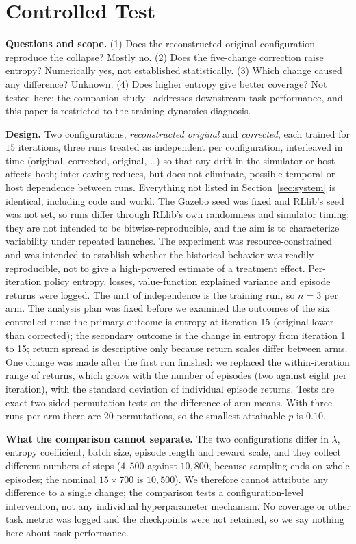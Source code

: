 \documentclass[12pt]{article}
\begin{document}
\section{Controlled Test}
\label{sec:test}
\textbf{Questions and scope.} (1) Does the reconstructed original configuration reproduce the collapse? Mostly no. (2) Does the five-change correction raise entropy? Numerically yes, not established statistically. (3) Which change caused any difference? Unknown. (4) Does higher entropy give better coverage? Not tested here; the companion study~\cite{pandhe2026mappo} addresses downstream task performance, and this paper is restricted to the training-dynamics diagnosis.

\textbf{Design.} Two configurations, \emph{reconstructed original} and
\emph{corrected}, each trained for $15$ iterations, three runs treated as independent
per configuration, interleaved in time (original, corrected, original, \dots)
so that any drift in the simulator or host affects both; interleaving reduces, but does not eliminate, possible temporal or host dependence between runs. Everything not
listed in Section~\ref{sec:system} is identical, including code and world.
The Gazebo seed was fixed and RLlib's seed was not set, so runs differ
through RLlib's own randomness and simulator timing; they are not intended to be bitwise-reproducible, and the aim is to characterize variability under repeated launches. The experiment was resource-constrained and was intended to establish whether the historical behavior was readily reproducible, not to give a high-powered estimate of a treatment effect. Per-iteration policy entropy, losses, value-function explained
variance and episode returns were logged. The unit of independence is the
training run, so $n=3$ per arm. The analysis plan was fixed before we examined the outcomes of the six controlled runs: the primary outcome is entropy at iteration 15 (original lower
than corrected); the secondary outcome is the change in entropy from
iteration 1 to 15; return spread is descriptive only because return scales
differ between arms. One change was made after the first run finished: we
replaced the within-iteration range of returns, which grows with the number
of episodes (two against eight per iteration), with the standard deviation of
individual episode returns. Tests are exact two-sided permutation tests on the difference
of arm means. With three runs per arm there are $20$ permutations, so the
smallest attainable $p$ is $0.10$.

\textbf{What the comparison cannot separate.} The two configurations differ
in $\lambda$, entropy coefficient, batch size, episode length and reward
scale, and they collect different numbers of steps ($4{,}500$ against
$10{,}800$, because sampling ends on whole episodes; the nominal $15\times700$
is $10{,}500$). We therefore cannot attribute any difference to a single
change; the comparison tests a configuration-level intervention, not any individual hyperparameter mechanism. No coverage or other task metric was logged and the checkpoints were
not retained, so we say nothing here about task performance.
\end{document}
